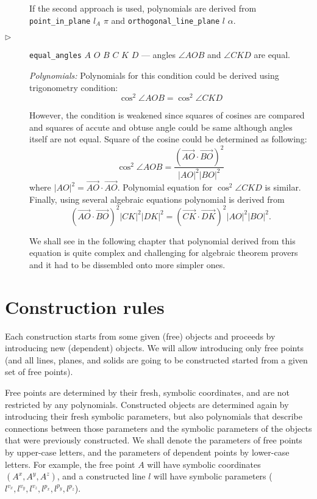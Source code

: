 \documentclass[final,1p,times,authoryear]{elsarticle}
\begin{document}
\begin{description}
If the second approach is used, polynomials are derived from {\tt
  point\_in\_plane} $l_A$ $\pi$ and {\tt orthogonal\_line\_plane} $l$
$\alpha$.

\item[$\triangleright$] {\tt equal\_angles} $A$ $O$ $B$ $C$ $K$ $D$ --- angles $\angle AOB$ and $\angle
CKD$ are equal.

{\em Polynomials:} Polynomials for this condition could be derived
using trigonometry condition:
$$\cos^2{\angle AOB} = \cos^2{\angle CKD}$$

However, the condition is weakened since squares of cosines are
compared and squares of accute and obtuse angle could be same although
angles itself are not equal. Square of the cosine could be determined as following:
$$\cos^2{\angle AOB} = \frac{(\overrightarrow{AO}\cdot
  \overrightarrow{BO})^2}{|AO|^2|BO|^2}$$ where $|AO|^2 =
\overrightarrow{AO}\cdot \overrightarrow{AO}$.  Polynomial equation
for $\cos^2{\angle CKD}$ is similar. Finally, using several algebraic
equations polynomial is derived from
$$(\overrightarrow{AO}\cdot  \overrightarrow{BO})^2|CK|^2|DK|^2 = (\overrightarrow{CK}\cdot  \overrightarrow{DK})^2|AO|^2|BO|^2.$$

We shall see in the following chapter that polynomial derived from
this equation is quite complex and challenging for algebraic theorem
provers and it had to be dissembled onto more simpler ones.

\end{description}

\section{Construction rules}


Each construction starts from some given (free) objects and proceeds
by introducing new (dependent) objects. We will allow introducing only
free points (and all lines, planes, and solids are going to be
constructed started from a given set of free points).

Free points are determined by their fresh, symbolic coordinates, and
are not restricted by any polynomials. Constructed objects are
determined again by introducing their fresh symbolic parameters, but
also polynomials that describe connections between those parameters
and the symbolic parameters of the objects that were previously
constructed. We shall denote the parameters of free points by
upper-case letters, and the parameters of dependent points by
lower-case letters. For example, the free point $A$ will have symbolic
coordinates $({A}^x, {A}^y, {A}^z)$, and a constructed line $l$ will
have symbolic parameters (${l}^{v_x}, {l}^{v_y}, {l}^{v_z}, {l}^{p_x},
{l}^{p_y}, {l}^{p_z}$).
\end{document}
